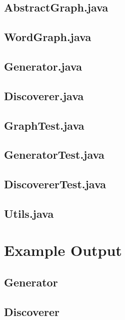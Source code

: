 \documentclass[12pt, titlepage, a4paper, twoside]{article}
\begin{document}
\subsection*{AbstractGraph.java}

\newpage

\subsection*{WordGraph.java}

\newpage

\subsection*{Generator.java}

\newpage

\subsection*{Discoverer.java}

\newpage

\subsection*{GraphTest.java}

\newpage

\subsection*{GeneratorTest.java}

\newpage

\subsection*{DiscovererTest.java}

\newpage

\subsection*{Utils.java}

\newpage

\section*{Example Output}

\subsection*{Generator}

\par

\par


\subsection*{Discoverer}

\par

\par

\end{document}
